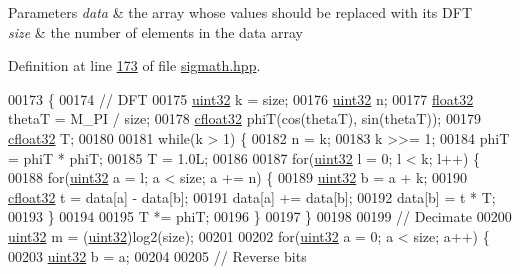 \begin{DoxyParams}{Parameters}
{\em data} & the array whose values should be replaced with its D\+F\+T\\
\hline
{\em size} & the number of elements in the data array \\
\hline
\end{DoxyParams}


Definition at line \hyperlink{sigmath_8hpp_source_l00173}{173} of file \hyperlink{sigmath_8hpp_source}{sigmath.\+hpp}.


\begin{DoxyCode}
00173                                           \{
00174         \textcolor{comment}{// DFT}
00175         \hyperlink{definitions_8hpp_a1134b580f8da4de94ca6b1de4d37975e}{uint32} k = size;
00176         \hyperlink{definitions_8hpp_a1134b580f8da4de94ca6b1de4d37975e}{uint32} n;
00177         \hyperlink{definitions_8hpp_aacdc525d6f7bddb3ae95d5c311bd06a1}{float32} thetaT = M\_PI / size;
00178         \hyperlink{definitions_8hpp_a960be6b6614c08090c16574dba10a421}{cfloat32} phiT(cos(thetaT), sin(thetaT));
00179         \hyperlink{definitions_8hpp_a960be6b6614c08090c16574dba10a421}{cfloat32} T;
00180 
00181         \textcolor{keywordflow}{while}(k > 1) \{
00182             n = k;
00183             k >>= 1;
00184             phiT = phiT * phiT;
00185             T = 1.0L;
00186 
00187             \textcolor{keywordflow}{for}(\hyperlink{definitions_8hpp_a1134b580f8da4de94ca6b1de4d37975e}{uint32} l = 0; l < k; l++) \{
00188                 \textcolor{keywordflow}{for}(\hyperlink{definitions_8hpp_a1134b580f8da4de94ca6b1de4d37975e}{uint32} a = l; a < size; a += n) \{
00189                     \hyperlink{definitions_8hpp_a1134b580f8da4de94ca6b1de4d37975e}{uint32} b = a + k;
00190                     \hyperlink{definitions_8hpp_a960be6b6614c08090c16574dba10a421}{cfloat32} t = data[a] - data[b];
00191                     data[a] += data[b];
00192                     data[b] = t * T;
00193                 \}
00194 
00195                 T *= phiT;
00196             \}
00197         \}
00198 
00199         \textcolor{comment}{// Decimate}
00200         \hyperlink{definitions_8hpp_a1134b580f8da4de94ca6b1de4d37975e}{uint32} m = (\hyperlink{definitions_8hpp_a1134b580f8da4de94ca6b1de4d37975e}{uint32})log2(size);
00201 
00202         \textcolor{keywordflow}{for}(\hyperlink{definitions_8hpp_a1134b580f8da4de94ca6b1de4d37975e}{uint32} a = 0; a < size; a++) \{
00203             \hyperlink{definitions_8hpp_a1134b580f8da4de94ca6b1de4d37975e}{uint32} b = a;
00204 
00205             \textcolor{comment}{// Reverse bits}

\end{DoxyCode}
